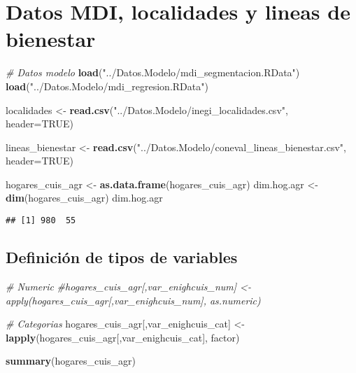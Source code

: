 \documentclass[11pt,]{article}
\newenvironment{Shaded}{\begin{snugshade}}{\end{snugshade}}
\newcommand{\KeywordTok}[1]{\textcolor[rgb]{0.13,0.29,0.53}{\textbf{#1}}}
\newcommand{\DataTypeTok}[1]{\textcolor[rgb]{0.13,0.29,0.53}{#1}}
\newcommand{\StringTok}[1]{\textcolor[rgb]{0.31,0.60,0.02}{#1}}
\newcommand{\CommentTok}[1]{\textcolor[rgb]{0.56,0.35,0.01}{\textit{#1}}}
\newcommand{\OtherTok}[1]{\textcolor[rgb]{0.56,0.35,0.01}{#1}}
\newcommand{\NormalTok}[1]{#1}
\begin{document}
\section{Datos MDI, localidades y lineas de
bienestar}\label{datos-mdi-localidades-y-lineas-de-bienestar}

\begin{Shaded}
\begin{Highlighting}[]
\CommentTok{# Datos modelo}
\KeywordTok{load}\NormalTok{(}\StringTok{"../Datos.Modelo/mdi_segmentacion.RData"}\NormalTok{)}
\KeywordTok{load}\NormalTok{(}\StringTok{"../Datos.Modelo/mdi_regresion.RData"}\NormalTok{)}

\NormalTok{localidades <-}\StringTok{ }\KeywordTok{read.csv}\NormalTok{(}\StringTok{"../Datos.Modelo/inegi_localidades.csv"}\NormalTok{, }
                        \DataTypeTok{header=}\OtherTok{TRUE}\NormalTok{)}

\NormalTok{lineas_bienestar <-}\StringTok{ }\KeywordTok{read.csv}\NormalTok{(}\StringTok{"../Datos.Modelo/coneval_lineas_bienestar.csv"}\NormalTok{,}
                             \DataTypeTok{header=}\OtherTok{TRUE}\NormalTok{)}

\NormalTok{hogares_cuis_agr <-}\StringTok{ }\KeywordTok{as.data.frame}\NormalTok{(hogares_cuis_agr)}
\NormalTok{dim.hog.agr <-}\StringTok{ }\KeywordTok{dim}\NormalTok{(hogares_cuis_agr)}
\NormalTok{dim.hog.agr}
\end{Highlighting}
\end{Shaded}

\begin{verbatim}
## [1] 980  55
\end{verbatim}

\subsection{Definición de tipos de
variables}\label{definicion-de-tipos-de-variables}

\begin{Shaded}
\begin{Highlighting}[]
\CommentTok{# Numeric }
\CommentTok{#hogares_cuis_agr[,var_enighcuis_num] <- apply(hogares_cuis_agr[,var_enighcuis_num], as.numeric)}

\CommentTok{# Categorias}
\NormalTok{hogares_cuis_agr[,var_enighcuis_cat] <-}\StringTok{ }\KeywordTok{lapply}\NormalTok{(hogares_cuis_agr[,var_enighcuis_cat], factor)}

\KeywordTok{summary}\NormalTok{(hogares_cuis_agr)}
\end{Highlighting}
\end{Shaded}
\end{document}

